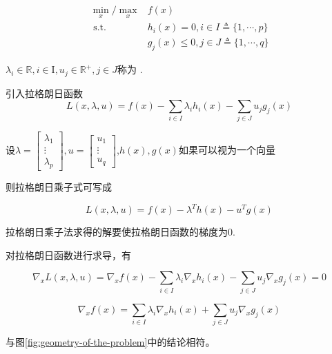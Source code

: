 \begin{definition}
    $$\begin{aligned}
        \min _{x} / \max_{x}& f(x) \\
\text{ s.t. } & h_{i}(x)=0, i \in I \triangleq\{1, \cdots, p\} \\
&g_{j}(x) \leq 0, j \in J \triangleq\{1, \cdots, q\}
    \end{aligned}$$

$ \lambda_{i} \in \mathbb{R}, i \in \mathrm{I}, u_{j} \in \mathbb{R}^{+}, j \in J $称为 .

引入拉格朗日函数 $$ L(x, \lambda, u)=f(x)-\sum_{i \in I} \lambda_{i} h_{i}(x)-\sum_{j \in J} u_{j} g_{j}(x)   $$

设$\lambda=\left[\begin{array}{c}\lambda_{1} \\ \vdots \\ \lambda_{p}\end{array}\right], u=\left[\begin{array}{c}u_{1} \\ \vdots \\ u_{q}\end{array}\right]$,$h(x),g(x)$如果可以视为一个向量

则拉格朗日乘子式可写成


$$ L(x, \lambda, u)=f(x) - \lambda^T h(x) - u^T g(x)$$

拉格朗日乘子法求得的解要使拉格朗日函数的梯度为0.

\end{definition}

\begin{theorem}[拉格朗日函数求导]
    对拉格朗日函数进行求导，有

$$ \nabla_{x} L(x, \lambda, u)=\nabla_{x} f(x)-\sum_{i \in I} \lambda_{i} \nabla_{x} h_{i}(x)-\sum_{j \in J} u_{j} \nabla_{x} g_{j}(x)=0 $$

$$\nabla_{x} f(x)=\sum_{i \in I} \lambda_{i} \nabla_{x} h_{i}(x)+\sum_{j \in J} u_{j} \nabla_{x} g_{j}(x)$$

    与图\ref{fig:geometry-of-the-problem}中的结论相符。
\end{theorem}

